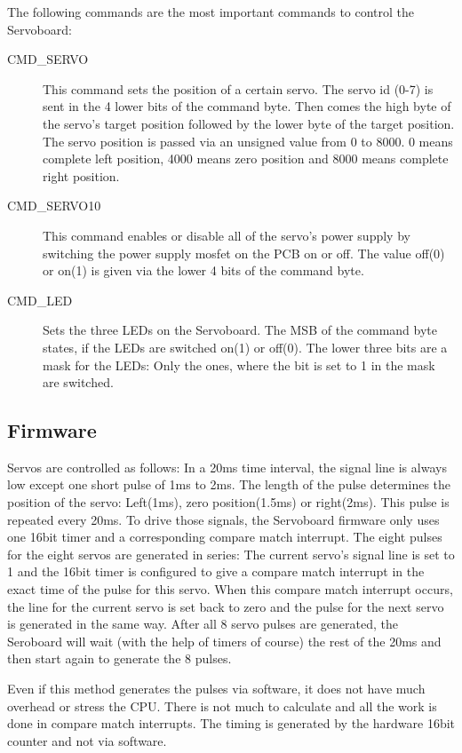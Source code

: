 \documentclass[a4paper
               ,10pt
               ,DIV=10 %
               ,BCOR=0.3cm
               ,pagesize %
               ,headings=small
               ,bibtotoc
               ]
               {scrartcl}
\begin{document}
The following commands are the most important commands to control the Servoboard:
\begin{description}
\item[CMD\_SERVO] This command sets the position of a certain servo. The servo id (0-7) is sent in the 4 lower bits of the command byte. Then comes the high byte of the servo's target position followed by the lower byte of the target position. The servo position is passed via an unsigned value from 0 to 8000. 0 means complete left position, 4000 means zero position and 8000 means complete right position.

\item[CMD\_SERVO10] This command enables or disable all of the servo's power supply by switching the power supply mosfet on the PCB on or off. The value off(0) or on(1) is given via the lower 4 bits of the command byte.

\item[CMD\_LED] Sets the three LEDs on the Servoboard. The MSB of the command byte states, if the LEDs are switched on(1) or off(0). The lower three bits are a mask for the LEDs: Only the ones, where the bit is set to 1 in the mask are switched.

\end{description}

\subsection{Firmware}
Servos are controlled as follows: 
In a 20ms time interval, the signal line is always low except one short pulse of 1ms to 2ms.
The length of the pulse determines the position of the servo:
Left(1ms), zero position(1.5ms) or right(2ms).
This pulse is repeated every 20ms.
To drive those signals, the Servoboard firmware only uses one 16bit timer and a corresponding compare match interrupt.
The eight pulses for the eight servos are generated in series: The current servo's signal line is set to 1 and the 16bit timer is configured to give a compare match interrupt in the exact time of the pulse for this servo.
When this compare match interrupt occurs, the line for the current servo is set back to zero and the pulse for the next servo is generated in the same way.
After all 8 servo pulses are generated, the Seroboard will wait (with the help of timers of course) the rest of the 20ms and then start again to generate the 8 pulses.

Even if this method generates the pulses via software, it does not have much overhead or stress the CPU.
There is not much to calculate and all the work is done in compare match interrupts.
The timing is generated by the hardware 16bit counter and not via software.
\end{document}
